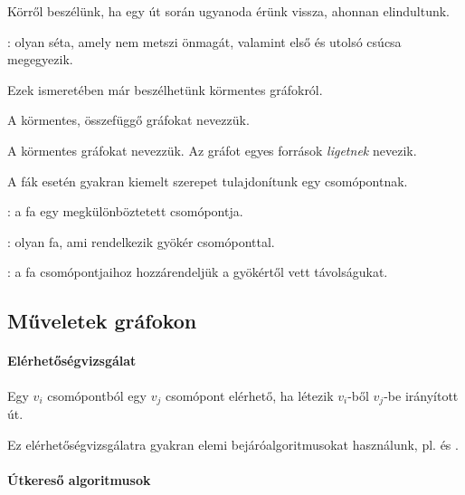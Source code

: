 Körről beszélünk, ha egy út során ugyanoda érünk vissza, ahonnan elindultunk.

\begin{definicio}
: olyan séta, amely nem metszi önmagát, valamint első és utolsó csúcsa megegyezik.
\end{definicio}

Ezek ismeretében már beszélhetünk körmentes gráfokról.

\begin{definicio}
	A körmentes, összefüggő gráfokat  nevezzük.
\end{definicio}

\begin{definicio}
	A körmentes gráfokat  nevezzük. Az  gráfot egyes források \emph{ligetnek} nevezik.
\end{definicio}

A fák esetén gyakran kiemelt szerepet tulajdonítunk egy csomópontnak.

\begin{definicio}
	: a fa egy megkülönböztetett csomópontja.
\end{definicio}

\begin{definicio}
	: olyan fa, ami rendelkezik gyökér csomóponttal.
\end{definicio}

\begin{definicio}
	: a fa csomópontjaihoz hozzárendeljük a gyökértől vett távolságukat.
\end{definicio}

\subsection{Műveletek gráfokon}

\paragraph{Elérhetőségvizsgálat}

Egy $v_i$ csomópontból egy $v_j$ csomópont elérhető, ha létezik $v_i$-ből $v_j$-be irányított út.

Ez elérhetőségvizsgálatra gyakran elemi bejáróalgoritmusokat használunk, pl.  és .

\paragraph{Útkereső algoritmusok}

